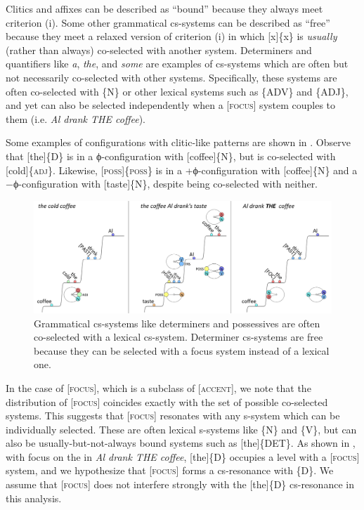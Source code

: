   Clitics and affixes can be described as “bound” because they always meet criterion (i). Some other grammatical cs-systems can be described as “free” because they meet a relaxed version of criterion (i) in which [x]\{x\} is \textit{usually} (rather than always) co-selected with another system. Determiners and quantifiers like \textit{a}, \textit{the}, and \textit{some} are examples of cs-systems which are often but not necessarily co-selected with other systems. Specifically, these systems are often co-selected with \{N\} or other lexical systems such as \{A\textsc{DV}\} and \{A\textsc{DJ}\}, and yet can also be selected independently when a [\textsc{focus}] system couples to them (i.e. \textit{Al drank THE coffee}).

  Some examples of configurations with clitic-like patterns are shown in {}. Observe that [the]\{\textsc{D}\} is in a ϕ-configuration with [coffee]\{N\}, but is co-selected with [cold]\{\textsc{adj}\}. Likewise, [\textsc{poss}]\{\textsc{poss}\} is in a +ϕ-configuration with [coffee]\{N\} and a −ϕ-configuration with [taste]\{N\}, despite being co-selected with neither. 

  
\begin{figure}
\includegraphics[width=\textwidth]{figures/Tilsen-img68.png}
\caption{Grammatical cs-systems like determiners and possessives are often co-selected with a lexical cs-system. Determiner cs-systems are free because they can be selected with a focus system instead of a lexical one.}
\label{fig:4:18}
\end{figure}
 

  In the case of [\textsc{focus}], which is a subclass of [\textsc{accent}], we note that the distribution of [\textsc{focus}] coincides exactly with the set of possible co-selected systems. This suggests that [\textsc{focus}] resonates with any s-system which can be individually selected. These are often lexical s-systems like \{N\} and \{V\}, but can also be usually-but-not-always bound systems such as [the]\{DET\}. As shown in {}, with focus on the  in \textit{Al drank THE coffee}, [the]\{D\} occupies a level with a [\textsc{focus}] system, and we hypothesize that [\textsc{focus}] forms a cs-resonance with \{D\}. We assume that [\textsc{focus}] does not interfere strongly with the [the]\{D\} cs-resonance in this analysis.

